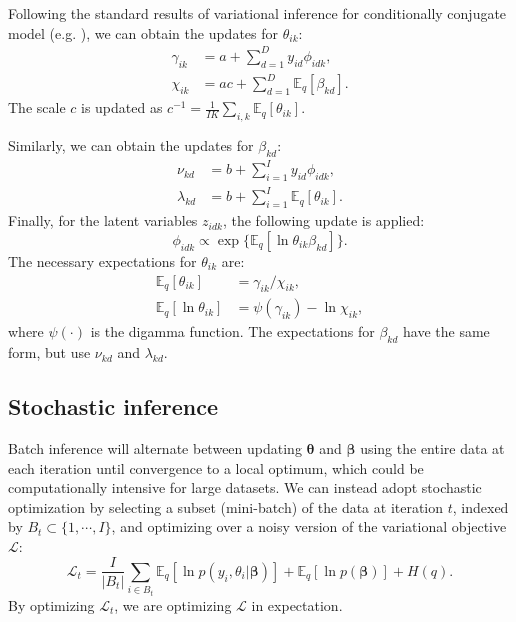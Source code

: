 Following the standard results of variational inference for conditionally conjugate model (e.g. \cite{hoffman2013stochastic}), we can obtain the updates for  $\theta_{ik}$:
\begin{equation}
\begin{split}
\gamma_{ik} &= a + \sum_{d=1}^D y_{id} \phi_{idk},\\
\chi_{ik} &= ac + \sum_{d=1}^D \mathbb{E}_q[\beta_{kd}].
\end{split}
\end{equation}
The scale $c$ is updated as $c^{-1} = \frac{1}{IK}\sum_{i, k} \mathbb{E}_q [\theta_{ik}]$.

Similarly, we can obtain the updates for $\beta_{kd}$:
\begin{equation}
\begin{split}
\nu_{kd} &= b + \sum_{i=1}^I y_{id} \phi_{idk},\\
\lambda_{kd} &= b + \sum_{i=1}^I \mathbb{E}_q[\theta_{ik}].
\end{split}
\end{equation}
Finally, for the latent variables $z_{idk}$, the following update is applied:
\begin{equation}
\phi_{idk} \propto \exp\{\mathbb{E}_q [\ln \theta_{ik} \beta_{kd}]\}.
\end{equation}
The necessary expectations for $\theta_{ik}$ are:
\begin{equation}
\begin{split}
\mathbb{E}_q[\theta_{ik}] &= \gamma_{ik} / \chi_{ik}, \\
\mathbb{E}_q[\ln \theta_{ik}] &= \psi(\gamma_{ik}) - \ln \chi_{ik},
\end{split}
\end{equation}
where $\psi(\cdot)$ is the digamma function. The expectations for $\beta_{kd}$ have the same form, but use $\nu_{kd}$ and $\lambda_{kd}$.

\subsection{Stochastic inference}\label{sec:stoc}

Batch inference will alternate between updating $\boldsymbol{\theta}$ and $\boldsymbol{\beta}$ using the entire data at each iteration until convergence to a local optimum, which could be computationally intensive for large datasets. We can instead adopt stochastic optimization by selecting a subset (mini-batch) of the data at iteration $t$, indexed by $B_t \subset \{1, \cdots, I\}$, and optimizing over a noisy version of the variational objective $\mathcal{L}$:
\begin{equation}\label{eq:noisy_obj}
\mathcal{L}_t = \frac{I}{|B_t|}\sum_{i \in B_t} \mathbb{E}_q[\ln p(y_i , \theta_i | \boldsymbol{\beta})]  + \mathbb{E}_q[\ln p(\boldsymbol{\beta})] + H(q).
\end{equation}
By optimizing $\mathcal{L}_t$, we are optimizing $\mathcal{L}$ in expectation. 

